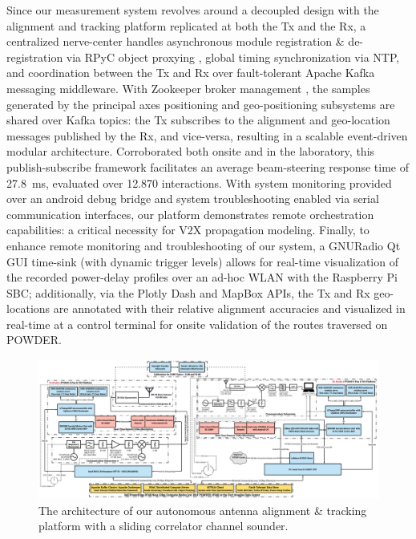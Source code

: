 \documentclass[10pt, twocolumn]{IEEEtran}
\begin{document}
Since our measurement system revolves around a decoupled design with the alignment and tracking platform replicated at both the Tx and the Rx, a centralized nerve-center handles asynchronous module registration \& de-registration via RPyC object proxying \cite{RPyC}, global timing synchronization via NTP, and coordination between the Tx and Rx over fault-tolerant Apache Kafka messaging middleware. With Zookeeper broker management \cite{Kafka}, the samples generated by the principal axes positioning and geo-positioning subsystems are shared over Kafka topics: the Tx subscribes to the alignment and geo-location messages published by the Rx, and vice-versa, resulting in a scalable event-driven modular architecture. Corroborated both onsite and in the laboratory, this publish-subscribe framework facilitates an average beam-steering response time of \SI{27.8}{\milli\second}, evaluated over \SI{12,870}{} interactions. With system monitoring provided over an android debug bridge and system troubleshooting enabled via serial communication interfaces, our platform demonstrates remote orchestration capabilities: a critical necessity for V$2$X propagation modeling. Finally, to enhance remote monitoring and troubleshooting of our system, a GNURadio Qt GUI time-sink (with dynamic trigger levels) allows for real-time visualization of the recorded power-delay profiles over an ad-hoc WLAN with the Raspberry Pi SBC; additionally, via the Plotly Dash and MapBox APIs, the Tx and Rx geo-locations are annotated with their relative alignment accuracies and visualized in real-time at a control terminal for onsite validation of the routes traversed on POWDER.
\begin{figure} [t]
    \centerline{
    \includegraphics[width=1.0\textwidth]{figs/System_Architecture.pdf}}
    \vspace{-2mm}
    \caption{The architecture of our autonomous antenna alignment \& tracking platform with a sliding correlator channel sounder.}
    \label{F1}
    \vspace{-6mm}
\end{figure}
\vspace{-3mm}
\end{document}
